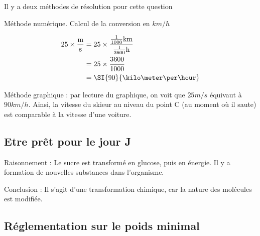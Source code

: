 \documentclass[a4paper,12pt]{article}
\begin{document}
Il y a deux méthodes de résolution pour cette question 

\begin{compactitem}
  \item Méthode numérique. Calcul de la conversion en $km/h$ 

  \begin{align*}
25 \times \frac{\text{m}}{\text{s}} &= 25 \times \frac{\frac{1}{1000} \text{km}}{\frac{1}{3600} \text{h}} \\
                      &= 25 \times \frac{3600}{1000} \\
                      &= \SI{90}{{\kilo\meter\per\hour}}
  \end{align*}


\item Méthode graphique : par lecture du graphique, on voit que $25 m/s$ équivaut à $90 km/h$. Ainsi, la vitesse du skieur au niveau du point C (au moment où il saute) est comparable à la vitesse d'une voiture.
\end{compactitem}

\subsection{Etre prêt pour le jour J}

\begin{compactitem}
  \item Raisonnement : Le sucre est transformé en glucose, puis en énergie. Il y a formation de nouvelles substances dans l’organisme.
  \item Conclusion : Il s’agit d’une transformation chimique, car la nature des molécules est modifiée.
\end{compactitem}

\subsection{Réglementation sur le poids minimal}
\end{document}
